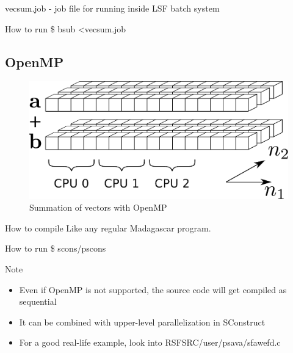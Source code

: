 \begin{frame}
  \begin{block}{vecsum.job - job file for running inside LSF batch system}
  
  \end{block}
  \begin{block}{How to run}
    \$ bsub \textless vecsum.job
  \end{block}
\end{frame}

\subsection{OpenMP}

\begin{frame}
  \begin{figure}
  \includegraphics[scale=0.55]{Fig/abcomp.pdf}
  \caption{Summation of vectors with OpenMP}
  \end{figure}
\end{frame}

\begin{frame}
\end{frame}
\begin{frame}
\end{frame}

\begin{frame}
  \begin{block}{How to compile}
    Like any regular Madagascar program. 
  \end{block}
  \begin{block}{How to run}
    \$ scons/pscons
  \end{block}
  \begin{block}{Note}
    \begin{itemize}
      \item Even if OpenMP is not supported, the source code will get
compiled as sequential
      \item It can be combined with upper-level parallelization in SConstruct
      \item For a good real-life example, look into RSFSRC/user/psava/sfawefd.c
    \end{itemize}
  \end{block}
\end{frame}

